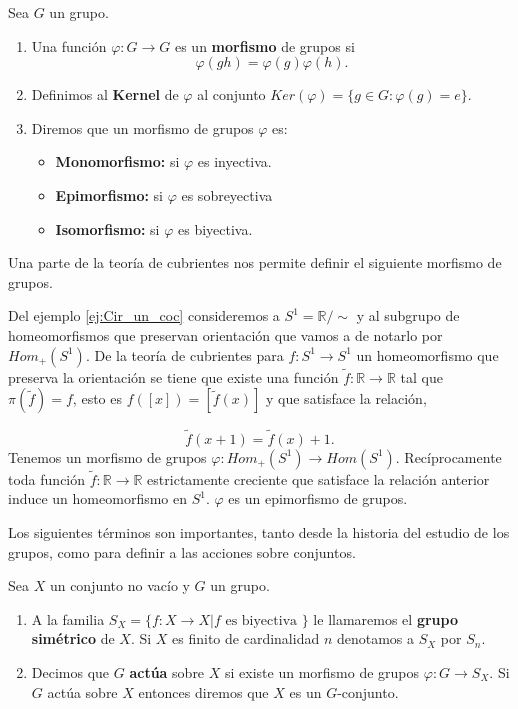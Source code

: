 \begin{df}
Sea $G$ un grupo. 
	\begin{enumerate}
	\item Una función $\varphi:G \to G$ es un \textbf{morfismo} de grupos si $$\varphi(gh)=\varphi(g) \varphi(h).$$
	\item Definimos al \textbf{Kernel} de $\varphi$ al conjunto $Ker(\varphi)=\{ g \in G: \varphi(g)=e\}$.
	\item Diremos que un morfismo de grupos $\varphi$ es:
	    \begin{itemize}
    	\item \textbf{Monomorfismo:} si $\varphi$ es inyectiva.
    	\item \textbf{Epimorfismo:} si $\varphi$ es sobreyectiva
	    \item \textbf{Isomorfismo:} si $\varphi$ es biyectiva.
    	\end{itemize}
	\end{enumerate}				
\end{df}
	
Una parte de la teoría de cubrientes nos permite definir el siguiente morfismo de grupos.

\begin{ej}
Del ejemplo \ref{ej:Cir_un_coc} consideremos a $S^1=\mathbb{R}/\sim$ y al subgrupo de homeomorfismos que preservan orientación que vamos a de notarlo por $Hom_+(S^1)$. De la teoría de cubrientes para $f: S^1 \to S^1$ un homeomorfismo que preserva la orientación se tiene que existe una función $\tilde{f}:\mathbb{R} \to \mathbb{R}$ tal que $\pi(\tilde{f})=f$, esto es $f([x])=[\tilde{f}(x)]$ y que satisface la relación,

$$\tilde{f}(x+1)=\tilde{f}(x)+1.$$
Tenemos un morfismo de grupos $\varphi: Hom_+(S^1) \to Hom(S^1)$. 
Recíprocamente toda función  $\tilde{f}:\mathbb{R} \to \mathbb{R}$ estrictamente  creciente que satisface la relación anterior induce un homeomorfismo en $S^1.$ $\varphi$ es un epimorfismo de grupos. 

\end{ej}
	
	Los siguientes términos son importantes, tanto desde la historia del estudio de los grupos, como para definir a las acciones sobre conjuntos.	
	
	\begin{df}
	Sea $X$ un conjunto no vacío y $G$ un grupo.
	\begin{enumerate}
	\item A la familia $S_X=\{f:X \to X| f \text{ es biyectiva } \}$ le llamaremos el \textbf{grupo simétrico} de $X$. Si $X$ es finito de cardinalidad $n$ denotamos a $S_X$ por $S_n$.
	\item Decimos que $G$ \textbf{actúa} sobre $X$ si existe un morfismo de grupos $\varphi:G \to S_X$.  Si $G$ actúa sobre $X$ entonces diremos que $X$ es un $G$-conjunto.
	\end{enumerate}
	
	\end{df}
	
